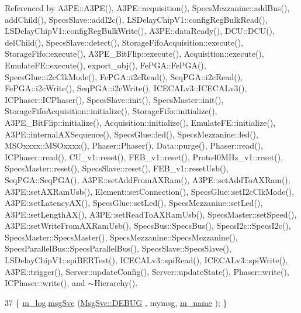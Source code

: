 Referenced by A3\+P\+E\+::\+A3\+P\+E(), A3\+P\+E\+::acquisition(), Specs\+Mezzanine\+::add\+Bus(), add\+Child(), Specs\+Slave\+::add\+I2c(), L\+S\+Delay\+Chip\+V1\+::config\+Reg\+Bulk\+Read(), L\+S\+Delay\+Chip\+V1\+::config\+Reg\+Bulk\+Write(), A3\+P\+E\+::data\+Ready(), D\+C\+U\+::\+D\+C\+U(), del\+Child(), Specs\+Slave\+::detect(), Storage\+Fifo\+Acquisition\+::execute(), Storage\+Fifo\+::execute(), A3\+P\+E\+\_\+\+Bit\+Flip\+::execute(), Acquisition\+::execute(), Emulate\+F\+E\+::execute(), export\+\_\+obj(), Fe\+P\+G\+A\+::\+Fe\+P\+G\+A(), Specs\+Glue\+::i2c\+Clk\+Mode(), Fe\+P\+G\+A\+::i2c\+Read(), Seq\+P\+G\+A\+::i2c\+Read(), Fe\+P\+G\+A\+::i2c\+Write(), Seq\+P\+G\+A\+::i2c\+Write(), I\+C\+E\+C\+A\+Lv3\+::\+I\+C\+E\+C\+A\+Lv3(), I\+C\+Phaser\+::\+I\+C\+Phaser(), Specs\+Slave\+::init(), Specs\+Master\+::init(), Storage\+Fifo\+Acquisition\+::initialize(), Storage\+Fifo\+::initialize(), A3\+P\+E\+\_\+\+Bit\+Flip\+::initialize(), Acquisition\+::initialize(), Emulate\+F\+E\+::initialize(), A3\+P\+E\+::internal\+A\+X\+Sequence(), Specs\+Glue\+::led(), Specs\+Mezzanine\+::led(), M\+S\+Oxxxx\+::\+M\+S\+Oxxxx(), Phaser\+::\+Phaser(), Data\+::purge(), Phaser\+::read(), I\+C\+Phaser\+::read(), C\+U\+\_\+v1\+::reset(), F\+E\+B\+\_\+v1\+::reset(), Proto40\+M\+Hz\+\_\+v1\+::reset(), Specs\+Master\+::reset(), Specs\+Slave\+::reset(), F\+E\+B\+\_\+v1\+::reset\+Usb(), Seq\+P\+G\+A\+::\+Seq\+P\+G\+A(), A3\+P\+E\+::set\+Add\+From\+A\+X\+Ram(), A3\+P\+E\+::set\+Add\+To\+A\+X\+Ram(), A3\+P\+E\+::set\+A\+X\+Ram\+Usb(), Element\+::set\+Connection(), Specs\+Glue\+::set\+I2c\+Clk\+Mode(), A3\+P\+E\+::set\+Latency\+A\+X(), Specs\+Glue\+::set\+Led(), Specs\+Mezzanine\+::set\+Led(), A3\+P\+E\+::set\+Length\+A\+X(), A3\+P\+E\+::set\+Read\+To\+A\+X\+Ram\+Usb(), Specs\+Master\+::set\+Speed(), A3\+P\+E\+::set\+Write\+From\+A\+X\+Ram\+Usb(), Specs\+Bus\+::\+Specs\+Bus(), Specs\+I2c\+::\+Specs\+I2c(), Specs\+Master\+::\+Specs\+Master(), Specs\+Mezzanine\+::\+Specs\+Mezzanine(), Specs\+Parallel\+Bus\+::\+Specs\+Parallel\+Bus(), Specs\+Slave\+::\+Specs\+Slave(), L\+S\+Delay\+Chip\+V1\+::spi\+B\+E\+R\+Test(), I\+C\+E\+C\+A\+Lv3\+::spi\+Read(), I\+C\+E\+C\+A\+Lv3\+::spi\+Write(), A3\+P\+E\+::trigger(), Server\+::update\+Config(), Server\+::update\+State(), Phaser\+::write(), I\+C\+Phaser\+::write(), and $\sim$\+Hierarchy().


\begin{DoxyCode}
37 \{ \hyperlink{classObject_a0d269813dd7ac1f24bc143031e2963f2}{m\_log}.\hyperlink{classMsgSvc_ad25f18047920cc59a314e5098259711c}{msgSvc} (\hyperlink{classMsgSvc_ae671eb7301996cd049d2da8a65925926a1dbdcc82dce88370ec335883c83b38b0}{MsgSvc::DEBUG}   , mymsg, \hyperlink{classObject_a8b83c95c705d2c3ba0d081fe1710f48d}{m\_name} ); \}
\end{DoxyCode}
\mbox{\label{classObject_a6c9a0397ca804e04d675ed05683f5420}} 
